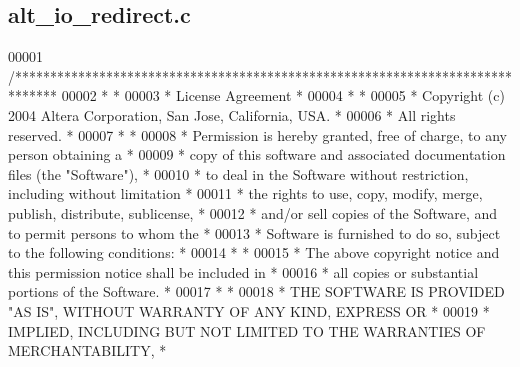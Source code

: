 \subsection{alt\+\_\+io\+\_\+redirect.\+c}
\label{alt__io__redirect_8c_source}

\begin{DoxyCode}
00001 \textcolor{comment}{/******************************************************************************}
00002 \textcolor{comment}{*                                                                             *}
00003 \textcolor{comment}{* License Agreement                                                           *}
00004 \textcolor{comment}{*                                                                             *}
00005 \textcolor{comment}{* Copyright (c) 2004 Altera Corporation, San Jose, California, USA.           *}
00006 \textcolor{comment}{* All rights reserved.                                                        *}
00007 \textcolor{comment}{*                                                                             *}
00008 \textcolor{comment}{* Permission is hereby granted, free of charge, to any person obtaining a     *}
00009 \textcolor{comment}{* copy of this software and associated documentation files (the "Software"),  *}
00010 \textcolor{comment}{* to deal in the Software without restriction, including without limitation   *}
00011 \textcolor{comment}{* the rights to use, copy, modify, merge, publish, distribute, sublicense,    *}
00012 \textcolor{comment}{* and/or sell copies of the Software, and to permit persons to whom the       *}
00013 \textcolor{comment}{* Software is furnished to do so, subject to the following conditions:        *}
00014 \textcolor{comment}{*                                                                             *}
00015 \textcolor{comment}{* The above copyright notice and this permission notice shall be included in  *}
00016 \textcolor{comment}{* all copies or substantial portions of the Software.                         *}
00017 \textcolor{comment}{*                                                                             *}
00018 \textcolor{comment}{* THE SOFTWARE IS PROVIDED "AS IS", WITHOUT WARRANTY OF ANY KIND, EXPRESS OR  *}
00019 \textcolor{comment}{* IMPLIED, INCLUDING BUT NOT LIMITED TO THE WARRANTIES OF MERCHANTABILITY,    *}

\end{DoxyCode}
